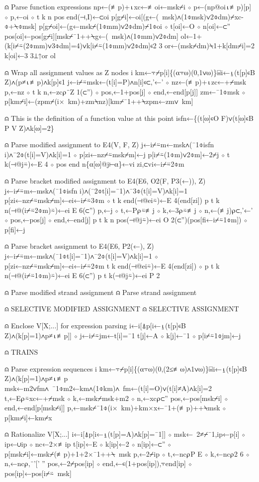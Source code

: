 \documentclass{article}%
\begin{document}
⍝ Parse function expressions
   np←(≢p)+⍳xc←≢oi←msk⌿i ⋄ p←(np@oi⍳≢p)[p] ⋄ p,←oi ⋄ t k n pos end(⊣,I)←⊂oi
   p[g⌿i]←oi[(g←(~msk)∧(1⌽msk)∨2⌽dm)⌿xc-⌽+⍀⌽msk]
   p[g⌿oi]←(g←msk⌿(1⌽mm)∨2⌽dm)⌿1⌽oi ⋄ t[oi]←O ⋄ n[oi]←⊂''
   pos[oi]←pos[g⌿i][msk⌿¯1++⍀g←(~msk)∧(1⌽mm)∨2⌽dm]
   ol←1+(k[i⌿⍨(2⌽mm)∨3⌽dm]=4)∨k[i⌿⍨(1⌽mm)∨2⌽dm]∊2 3
   or←(msk⌿dm)⍀1+k[dm⌿i]=2
   k[oi]←3 3⊥↑or ol

⍝ Wrap all assignment values as Z nodes
   i km←⍪⌿p[i]\{(⍺⍪⍵)(0,1∨⍵)\}⌸i←⍸(t[p]∊B Z)∧(p≠⍳≢p)∧k[p]∊1
   j←i⌿⍨msk←(t[i]=P)∧n[i]∊⊂,'←' ⋄ nz←(≢p)+⍳zc←+⌿msk
   p,←nz ⋄ t k n,←zc⍴¨Z 1(⊂'') ⋄ pos,←1+pos[j] ⋄ end,←end[p[j]]
   zm←¯1⌽msk ⋄ p[km⌿i]←(zpm⌿(i×~km)+zm⍀nz)[km⌿¯1++⍀zpm←zm∨~km]

⍝ This is the definition of a function value at this point
   isfn←\{(t[⍵]∊O F)∨(t[⍵]∊B P V Z)∧k[⍵]=2\}

⍝ Parse modified assignment to E4(V, F, Z)
   j←i⌿⍨m←msk∧(¯1⌽isfn i)∧¯2⌽(t[i]=V)∧k[i]=1 ⋄ p[zi←nz⌿⍨msk⌿m]←j
   p[i⌿⍨(1⌽m)∨2⌽m]←2⌿j ⋄ t k(⊣@j⍨)←E 4 ⋄ pos end n\{⍺[⍵]@j⊢⍺\}←vi zi,⊂vi←i⌿⍨2⌽m

⍝ Parse bracket modified assignment to E4(E6, O2(F, P3(←)), Z)
   j←i⌿⍨m←msk∧(¯1⌽isfn i)∧(¯2⌽t[i]=¯1)∧¯3⌽(t[i]=V)∧k[i]=1
   p[zi←nz⌿⍨msk⌿m]←ei←i⌿⍨3⌽m ⋄ t k end(⊣@ei⍨)←E 4(end[zi])
   p t k n(⊣@(i⌿⍨2⌽m)⍨)←ei E 6(⊂'')
   p,←j ⋄ t,←P⍴⍨≢j ⋄ k,←3⍴⍨≢j ⋄ n,←(≢j)⍴⊂,'←' ⋄ pos,←pos[j] ⋄ end,←end[j]
   p t k n pos(⊣@j⍨)←ei O 2(⊂'')(pos[fi←i⌿⍨1⌽m]) ⋄ p[fi]←j

⍝ Parse bracket assignment to E4(E6, P2(←), Z)
   j←i⌿⍨m←msk∧(¯1⌽t[i]=¯1)∧¯2⌽(t[i]=V)∧k[i]=1 ⋄ p[zi←nz⌿⍨msk⌿m]←ei←i⌿⍨2⌽m
   t k end(⊣@ei⍨)←E 4(end[zi]) ⋄ p t k n(⊣@(i⌿⍨1⌽m)⍨)←ei E 6(⊂'')
   p t k(⊣@j⍨)←ei P 2

⍝ Parse modified strand assignment
⍝ Parse strand assignment

⍝ SELECTIVE MODIFIED ASSIGNMENT
⍝ SELECTIVE ASSIGNMENT

⍝ Enclose V[X;...] for expression parsing
   i←i[⍋p[i←⍸(t[p]∊B Z)∧(k[p]=1)∧p≠⍳≢p]] ⋄ j←i⌿⍨jm←t[i]=¯1
   t[j]←A ⋄ k[j]←¯1 ⋄ p[i⌿⍨1⌽jm]←j

⍝ TRAINS

⍝ Parse expression sequences
   i km←⍪⌿p[i]\{(⍺⍪⍵)(0,(2≤≢⍵)∧1∨⍵)\}⌸i←⍸(t[p]∊B Z)∧(k[p]=1)∧p≠⍳≢p
   msk←m2∨fm∧~¯1⌽m2←km∧(1⌽km)∧~fm←(t[i]=O)∨(t[i]≠A)∧k[i]=2
   t,←E⍴⍨xc←+⌿msk ⋄ k,←msk⌿msk+m2 ⋄ n,←xc⍴⊂''
   pos,←pos[msk⌿i] ⋄ end,←end[p[msk⌿i]]
   p,←msk⌿¯1⌽(i×~km)+km×x←¯1+(≢p)++⍀msk ⋄ p[km⌿i]←km⌿x

⍝ Rationalize V[X;...]
   i←i[⍋p[i←⍸(t[p]=A)∧k[p]=¯1]] ⋄ msk←~2≠⌿¯1,ip←p[i] ⋄ ip←∪ip ⋄ nc←2×≢ip
   t[ip]←E ⋄ k[ip]←2 ⋄ n[ip]←⊂'' ⋄ p[msk⌿i]←msk⌿(≢p)+1+2×¯1++⍀~msk
   p,←2⌿ip ⋄ t,←nc⍴P E ⋄ k,←nc⍴2 6 ⋄ n,←nc⍴,¨'[' ''
   pos,←2⌿pos[ip] ⋄ end,←∊(1+pos[ip]),⍪end[ip] ⋄ pos[ip]←pos[i⌿⍨~msk]
\end{document}
